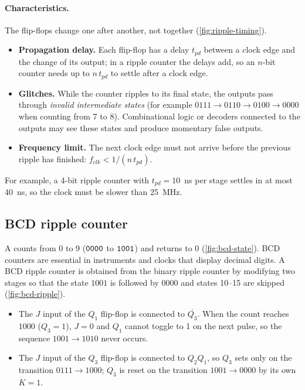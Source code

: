 \paragraph{Characteristics.} The flip-flops change one after another, not together (\cref{fig:ripple-timing}).
\begin{itemize}
  \item \textbf{Propagation delay.} Each flip-flop has a delay $t_{pd}$ between a clock edge and the change of its output; in a ripple counter the delays add, so an $n$-bit counter needs up to $n\,t_{pd}$ to settle after a clock edge.
  \item \textbf{Glitches.} While the counter ripples to its final state, the outputs pass through \emph{invalid intermediate states} (for example $0111\to0110\to0100\to0000$ when counting from 7 to 8). Combinational logic or decoders connected to the outputs may see these states and produce momentary false outputs.
  \item \textbf{Frequency limit.} The next clock edge must not arrive before the previous ripple has finished: $f_{clk} < 1/(n\,t_{pd})$.
\end{itemize}
For example, a 4-bit ripple counter with $t_{pd}=10$~ns per stage settles in at most 40~ns, so the clock must be slower than 25~MHz.


\subsection{BCD ripple counter}
A  counts from 0 to 9 ($\mathtt{0000}$ to $\mathtt{1001}$) and returns to 0 (\cref{fig:bcd-state}). BCD counters are essential in instruments and clocks that display decimal digits. A BCD ripple counter is obtained from the binary ripple counter by modifying two stages so that the state $1001$ is followed by $0000$ and states 10--15 are skipped (\cref{fig:bcd-ripple}).
\begin{itemize}
  \item The $J$ input of the $Q_1$ flip-flop is connected to $\overline{Q_3}$. When the count reaches $1000$ ($Q_3=1$), $J=0$ and $Q_1$ cannot toggle to 1 on the next pulse, so the sequence $1001\to1010$ never occurs.
  \item The $J$ input of the $Q_3$ flip-flop is connected to $Q_2Q_1$, so $Q_3$ sets only on the transition $0111\to1000$; $Q_3$ is reset on the transition $1001\to0000$ by its own $K=1$.
\end{itemize}

